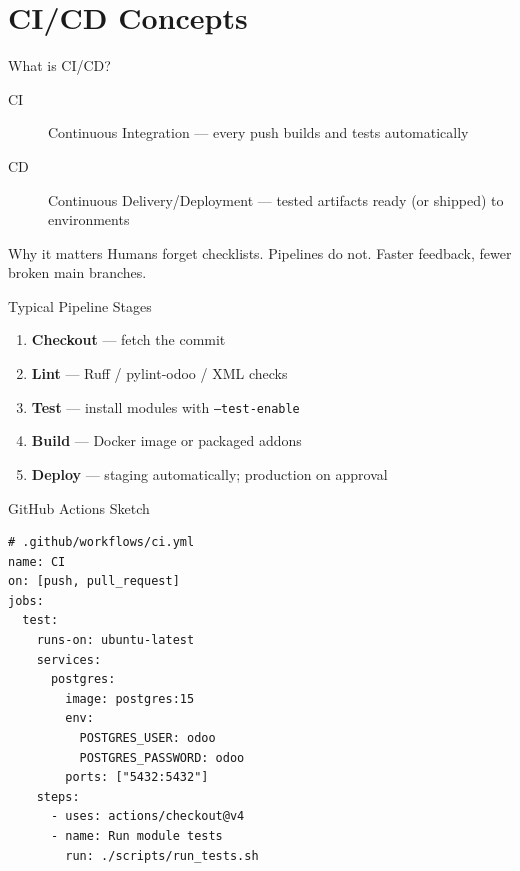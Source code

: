 \section{CI/CD Concepts}

\begin{frame}{What is CI/CD?}
\begin{description}
  \item[CI] Continuous Integration --- every push builds and tests automatically
  \item[CD] Continuous Delivery/Deployment --- tested artifacts ready (or shipped) to environments
\end{description}

\vspace{0.5em}
\begin{block}{Why it matters}
  Humans forget checklists. Pipelines do not. Faster feedback, fewer broken main branches.
\end{block}
\end{frame}

\begin{frame}{Typical Pipeline Stages}
\begin{enumerate}
  \item \textbf{Checkout} --- fetch the commit
  \item \textbf{Lint} --- Ruff / pylint-odoo / XML checks
  \item \textbf{Test} --- install modules with \texttt{--test-enable}
  \item \textbf{Build} --- Docker image or packaged addons
  \item \textbf{Deploy} --- staging automatically; production on approval
\end{enumerate}
\end{frame}

\begin{frame}[fragile]{GitHub Actions Sketch}
\begin{lstlisting}[language={}]
# .github/workflows/ci.yml
name: CI
on: [push, pull_request]
jobs:
  test:
    runs-on: ubuntu-latest
    services:
      postgres:
        image: postgres:15
        env:
          POSTGRES_USER: odoo
          POSTGRES_PASSWORD: odoo
        ports: ["5432:5432"]
    steps:
      - uses: actions/checkout@v4
      - name: Run module tests
        run: ./scripts/run_tests.sh
\end{lstlisting}
\end{frame}


